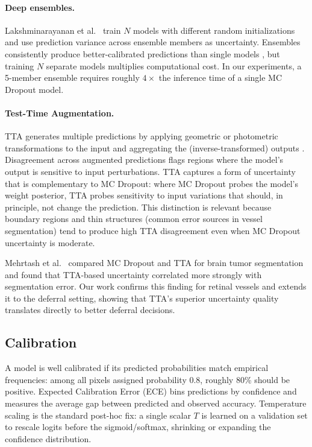 \paragraph{Deep ensembles.} Lakshminarayanan et al.\
\citep{lakshminarayanan2017simple} train $N$ models with different random
initializations and use prediction variance across ensemble members as
uncertainty. Ensembles consistently produce better-calibrated predictions than
single models \citep{ovadia2019can}, but training $N$ separate models multiplies
computational cost. In our experiments, a 5-member ensemble requires roughly
$4\times$ the inference time of a single MC Dropout model.

\paragraph{Test-Time Augmentation.} TTA generates multiple predictions by
applying geometric or photometric transformations to the input and aggregating
the (inverse-transformed) outputs \citep{wang2019aleatoric,
ayhan2018test,moshkov2020tta}. Disagreement across augmented predictions
flags regions where the model's output is sensitive to input perturbations.
TTA captures a form of uncertainty that is complementary to MC Dropout:
where MC Dropout probes the model's weight posterior, TTA probes sensitivity
to input variations that should, in principle, not change the prediction. This
distinction is relevant because boundary regions and thin structures (common
error sources in vessel segmentation) tend to produce high TTA disagreement
even when MC Dropout uncertainty is moderate.

Mehrtash et al.\ \citep{mehrtash2020confidence} compared MC Dropout and TTA
for brain tumor segmentation and found that TTA-based uncertainty correlated
more strongly with segmentation error. Our work confirms this finding for
retinal vessels and extends it to the deferral setting, showing that TTA's
superior uncertainty quality translates directly to better deferral decisions.

\subsection{Calibration}

A model is well calibrated if its predicted probabilities match empirical
frequencies: among all pixels assigned probability 0.8, roughly 80\% should
be positive. Expected Calibration Error (ECE) \citep{naeini2015obtaining}
bins predictions by confidence and measures the average gap between predicted
and observed accuracy. Temperature scaling \citep{guo2017calibration} is the
standard post-hoc fix: a single scalar $T$ is learned on a validation set to
rescale logits before the sigmoid/softmax, shrinking or expanding the
confidence distribution.


